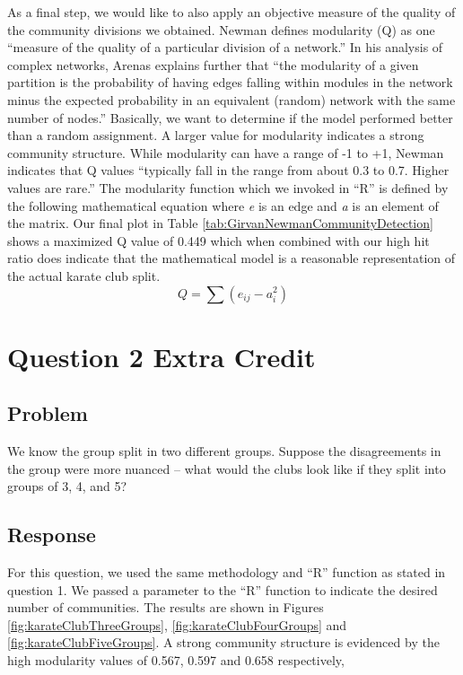\documentclass[letterpaper,11pt]{report}
\begin{document}
\begin{savenotes}
As a final step, we would like to also apply an objective measure of the quality of the community divisions we obtained.  Newman \cite{newman2004finding} defines modularity (Q) as one ``measure of the quality of a particular division of a network.'' In his analysis of complex networks, Arenas \cite{arenas2008analysis} explains further that ``the modularity of a given partition is the probability of having edges falling within modules in the network minus the expected probability in an equivalent (random) network with the same number of nodes.'' Basically, we want to determine if the model performed better than a random assignment. A larger value for modularity indicates a strong community structure. While modularity can have a range of -1 to +1, Newman \cite{newman2004finding} indicates that Q values ``typically fall in the range from about 0.3 to 0.7.  Higher values are rare.'' The modularity function which we invoked in ``R'' is defined by the following mathematical equation where \emph{e} is an edge and \emph{a} is an element of the matrix. Our final plot in Table \ref{tab:GirvanNewmanCommunityDetection} shows a maximized Q value of 0.449 which when combined with our high hit ratio does indicate that the mathematical model is a reasonable representation of the actual karate club split.
\begin{equation}
Q = \sum (e_{ij} - a^{2}_{i}) 
\end{equation}

\section{Question 2 Extra Credit}
\subsection{Problem}We know the group split in two different groups.  Suppose the disagreements in the group were more nuanced -- what would the clubs look like if they split into groups of 3, 4, and 5?
\subsection{Response}For this question, we used the same methodology and ``R'' function as stated in question 1. We passed a parameter to the ``R'' function to indicate the desired number of communities.  The results are shown in Figures \ref{fig:karateClubThreeGroups}, \ref{fig:karateClubFourGroups} and \ref{fig:karateClubFiveGroups}. A strong community structure is evidenced by the high modularity values of 0.567, 0.597 and 0.658 respectively,


\end{savenotes}
\end{document}
